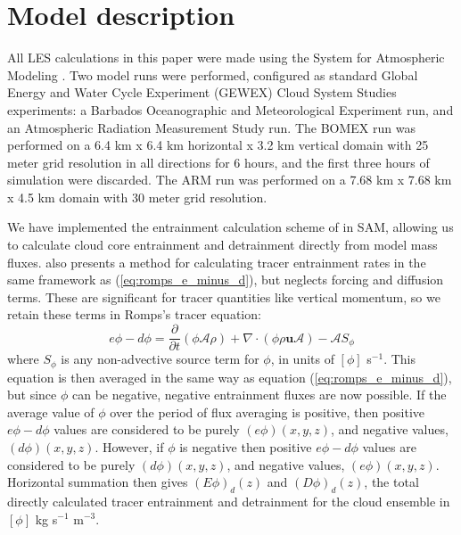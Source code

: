 \documentclass[12pt]{article}
\begin{document}

\section{Model description}

All LES calculations in this paper were made using the System for Atmospheric 
Modeling \citep[SAM;][]{Khairoutdinov2003}.  Two model runs were performed, 
configured as standard Global Energy and Water Cycle Experiment (GEWEX) 
Cloud System Studies \citep[GCSS;][]{Randall2003} experiments: a Barbados 
Oceanographic and Meteorological Experiment \citep[BOMEX;][]{Siebesma2003} run,
and an Atmospheric Radiation Measurement Study \citep[ARM;][]{Brown2002} run. 
The BOMEX run was performed on a 6.4 km x 6.4 km horizontal x 3.2 km vertical 
domain with 25 meter grid resolution in all directions for 6 hours, and the 
first three hours of simulation were discarded. The ARM run was performed on a 
7.68 km x 7.68 km x 4.5 km domain with 30 meter grid resolution.

We have implemented the entrainment calculation scheme of \cite{Romps2010} in 
SAM, allowing us to calculate cloud core entrainment and detrainment directly 
from model mass fluxes.  \citet[eq. 4]{Romps2010} also presents a method for 
calculating tracer entrainment rates in the same framework as 
(\ref{eq:romps_e_minus_d}), but neglects forcing and diffusion terms.  These 
are significant for tracer quantities like vertical momentum, so we retain 
these terms in Romps's tracer equation:
\begin{equation}
  \label{eq:romps_ephi_minus_dphi}
  e\phi - d\phi = \frac{\partial}{\partial t}(\phi \mathcal{A} \rho) 
                + \nabla \cdot (\phi \rho \mathbf{u} \mathcal{A})
                - \mathcal{A}S_\phi
\end{equation}
where $S_\phi$ is any non-advective source term for $\phi$, in units of 
$[\phi]$ s$^{-1}$.  This equation is then averaged in the same way as equation 
(\ref{eq:romps_e_minus_d}), but since $\phi$ can be negative, negative 
entrainment fluxes are now possible.  If the average value of $\phi$ over the 
period of flux averaging is positive, then positive $e\phi-d\phi$ values are 
considered to be purely $(e\phi)(x,y,z)$, and negative values, 
$(d\phi)(x,y,z)$.  However, if $\phi$ is negative then positive $e\phi-d\phi$ 
values are considered to be purely $(d\phi)(x,y,z)$, and negative values, 
$(e\phi)(x,y,z)$.  Horizontal summation then gives $(E\phi)_d(z)$ and 
$(D\phi)_d(z)$, the total directly calculated tracer entrainment and 
detrainment for the cloud ensemble in $[\phi]$ kg s$^{-1}$ m$^{-3}$.
\end{document}
